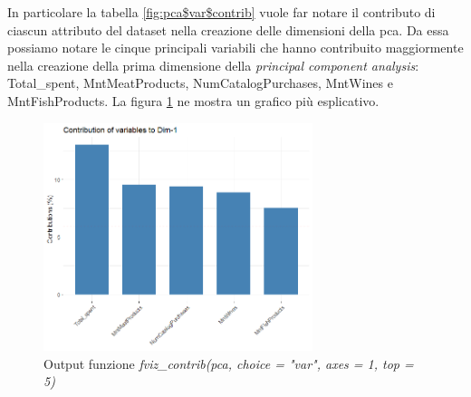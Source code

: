 \documentclass[letterpaper,11pt]{article}
\begin{document}
In particolare la tabella \ref{fig:pca$var$contrib} vuole far notare il contributo di ciascun attributo del dataset nella creazione delle dimensioni della pca. Da essa possiamo notare le cinque principali variabili che hanno contribuito maggiormente nella creazione della prima dimensione della \textit{principal component analysis}: Total\_spent, MntMeatProducts, NumCatalogPurchases, MntWines e MntFishProducts. La figura \ref{fig:fviz_contrib(pca, choice = "var", axes = 1, top = 5)} ne mostra un grafico più esplicativo.
\begin{figure}[H]
    \centering
    \includegraphics[width=0.7\textwidth]{Img/PCA/Rplot01.png}
    \caption{Output funzione \textit{fviz\_contrib(pca, choice = "var", axes = 1, top = 5)}}
    \label{fig:fviz_contrib(pca, choice = "var", axes = 1, top = 5)}
\end{figure}
\end{document}
